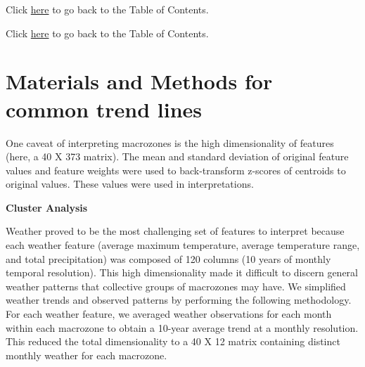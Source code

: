 \documentclass[titlepage, 11 pt]{article}
\numberwithin{figure}{section}
\begin{document}
		Click \hyperlink{toc}{here} to go back to the Table of Contents.
	
		
	
		
	
		
	
			
		
				
		
		Click \hyperlink{toc}{here} to go back to the Table of Contents.
	
	
	
	
	\section{Materials and Methods for common trend lines}
	One caveat of interpreting macrozones is the high dimensionality of features (here, a 40 X 373 matrix).  The mean and standard deviation of original feature values and feature weights were used to back-transform z-scores of centroids to original values.  These values were used in interpretations.    
	
	\bigskip
	
	\noindent \textbf{Cluster Analysis} \\
	
	\smallskip
	
	\noindent Weather proved to be the most challenging set of features to interpret because each weather feature (average maximum temperature, average temperature range, and total precipitation) was composed of 120 columns (10 years of monthly temporal resolution).  This high dimensionality made it difficult to discern general weather patterns that collective groups of macrozones may have.  We simplified weather trends and observed patterns by performing the following methodology.  For each weather feature, we averaged weather observations for each month within each macrozone to obtain a 10-year average trend at a monthly resolution.  This reduced the total dimensionality to a 40 X 12 matrix containing distinct monthly weather for each macrozone.  \\
	
\end{document}
